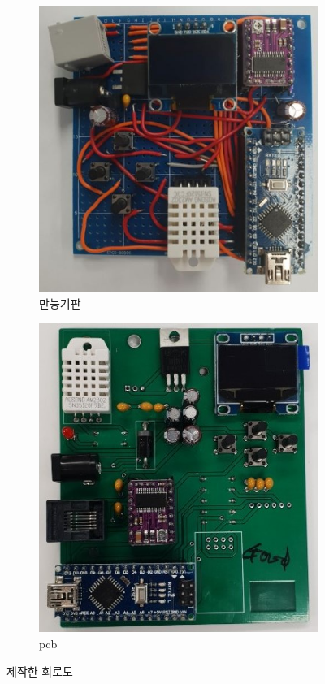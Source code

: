 \documentclass{abstract_hutech}
\begin{document}
\begin{figure}[h]
\begin{subfigure}{0.43\linewidth}
\centering
\includegraphics[scale=0.3]{circuit1}
\caption{만능기판}
\label{fig:circuit1}
\end{subfigure}
\begin{subfigure}{0.26\textwidth}
\centering
\includegraphics[scale=0.4]{pcbcircuit}
\caption{pcb}
\label{fig:pcbcircuit}
\end{subfigure}
\caption{제작한 회로도}
\label{fig:ciruit}
\end{figure}
\end{document}
